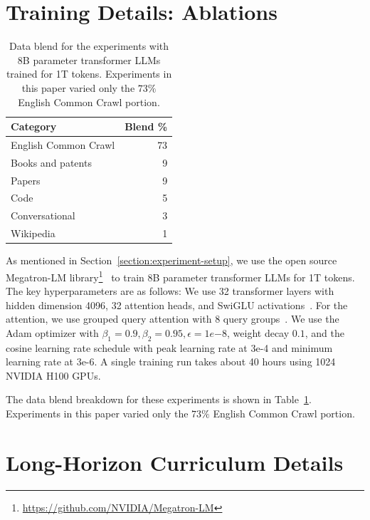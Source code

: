\documentclass[11pt]{article}
\begin{document}
\section{Training Details: Ablations}
\label{appendix:hyperparameters}
\begin{table}[!htbp] \small \centering
\begin{tabularx}{\linewidth}{Xr}
\toprule
\textbf{Category}    & \textbf{Blend \%} \\ \midrule
English Common Crawl & 73                \\
Books and patents    & 9                 \\
Papers               & 9                 \\
Code                 & 5                 \\
Conversational       & 3                 \\
Wikipedia            & 1                 \\ \bottomrule
\end{tabularx}
\caption{Data blend for the experiments with 8B parameter transformer LLMs trained for 1T tokens. Experiments in this paper varied only the $73\%$ English Common Crawl portion.}
\label{table:datablend}
\end{table}

As mentioned in Section~\ref{section:experiment-setup},
we use the open source Megatron-LM library\footnote{\url{https://github.com/NVIDIA/Megatron-LM}}~\citep{shoeybi2019megatron} to train 8B parameter transformer LLMs for 1T tokens. The key hyperparameters are as follows: We use 32 transformer layers with hidden dimension 4096, 32 attention heads, and SwiGLU activations~\cite{shazeer2020glu}. For the attention, we use grouped query attention with 8 query groups~\citep{ainslie2023gqa}. We use the Adam optimizer with $\beta_1 = 0.9, \beta_2 = 0.95, \epsilon=1e{-8}$, weight decay $0.1$, and the cosine learning rate schedule with peak learning rate at 3e-4 and minimum learning rate at 3e-6. A single training run takes about 40 hours using 1024 NVIDIA H100 GPUs.

The data blend breakdown for these experiments is shown in Table~\ref{table:datablend}. Experiments in this paper varied only the $73\%$ English Common Crawl portion.

\section{Long-Horizon Curriculum Details}
\label{appendix:8b15t}
\end{document}
